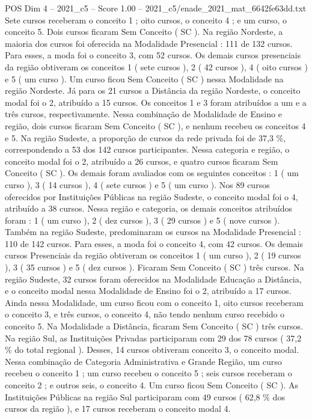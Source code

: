 \begin{textsample}{POS Dim 4 – 2021\_c5 – Score 1.00 – 2021\_c5/enade\_2021\_mat\_6642fe63dd.txt}
Sete cursos receberam o conceito 1 ; oito cursos, o conceito 4 ; e um curso, o conceito 5.
Dois cursos ficaram Sem Conceito ( SC ).
Na região Nordeste, a maioria dos cursos foi oferecida na Modalidade Presencial : 111 de 132 cursos.
Para esses, a moda foi o conceito 3, com 52 cursos.
Os demais cursos presenciais da região obtiveram os conceitos 1 ( sete cursos ), 2 ( 42 cursos ), 4 ( oito cursos ) e 5 ( um curso ).
Um curso ficou Sem Conceito ( SC ) nessa Modalidade na região Nordeste.
Já para os 21 cursos a Distância da região Nordeste, o conceito modal foi o 2, atribuído a 15 cursos.
Os conceitos 1 e 3 foram atribuídos a um e a três cursos, respectivamente.
Nessa combinação de Modalidade de Ensino e região, dois cursos ficaram Sem Conceito ( SC ), e nenhum recebeu os conceitos 4 e 5.
Na região Sudeste, a proporção de cursos da rede privada foi de 37,3 \%, correspondendo a 53 dos 142 cursos participantes.
Nessa categoria e região, o conceito modal foi o 2, atribuído a 26 cursos, e quatro cursos ficaram Sem Conceito ( SC ).
Os demais foram avaliados com os seguintes conceitos : 1 ( um curso ), 3 ( 14 cursos ), 4 ( sete cursos ) e 5 ( um curso ).
Nos 89 cursos oferecidos por Instituições Públicas na região Sudeste, o conceito modal foi o 4, atribuído a 38 cursos.
Nessa região e categoria, os demais conceitos atribuídos foram : 1 ( um curso ), 2 ( dez cursos ), 3 ( 29 cursos ) e 5 ( nove cursos ).
Também na região Sudeste, predominaram os cursos na Modalidade Presencial : 110 de 142 cursos.
Para esses, a moda foi o conceito 4, com 42 cursos.
Os demais cursos Presenciais da região obtiveram os conceitos 1 ( um curso ), 2 ( 19 cursos ), 3 ( 35 cursos ) e 5 ( dez cursos ).
Ficaram Sem Conceito ( SC ) três cursos.
Na região Sudeste, 32 cursos foram oferecidos na Modalidade Educação a Distância, e o conceito modal nessa Modalidade de Ensino foi o 2, atribuído a 17 cursos.
Ainda nessa Modalidade, um curso ficou com o conceito 1, oito cursos receberam o conceito 3, e três cursos, o conceito 4, não tendo nenhum curso recebido o conceito 5.
Na Modalidade a Distância, ficaram Sem Conceito ( SC ) três cursos.
Na região Sul, as Instituições Privadas participaram com 29 dos 78 cursos ( 37,2 \% do total regional ).
Desses, 14 cursos obtiveram conceito 3, o conceito modal.
Nessa combinação de Categoria Administrativa e Grande Região, um curso recebeu o conceito 1 ; um curso recebeu o conceito 5 ; seis cursos receberam o conceito 2 ; e outros seis, o conceito 4.
Um curso ficou Sem Conceito ( SC ).
As Instituições Públicas na região Sul participaram com 49 cursos ( 62,8 \% dos cursos da região ), e 17 cursos receberam o conceito modal 4.

\end{textsample}
